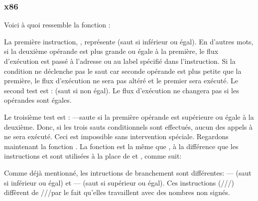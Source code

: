 \subsubsection{x86}


Voici à quoi ressemble la fonction  :




La première instruction, \JLE, représente  (saut si inférieur ou égal).
En d'autres mots, si la deuxième opérande est plus grande ou égale à la première,
le flux d'exécution est passé à l'adresse ou au label spécifié dans l'instruction.
Si la condition ne déclenche pas le saut car seconde opérande est plus petite que
la première, le flux d'exécution ne sera pas altéré et le premier \printf sera
exécuté.
Le second test est \JNE:  (saut si non égal).
Le flux d'exécution ne changera pas si les opérandes sont égales.

Le troisième test est \JGE: ---saute si la première
opérande est supérieure ou égale à la deuxième.
Donc, si les trois sauts conditionnels sont effectués, aucun des appels à \printf
ne sera exécuté.
Ceci est impossible sans intervention spéciale.
Regardons maintenant la fonction .
La fonction  est la même que , à la différence
que les instructions \JBE et \JAE sont utilisées à la place de \JLE et \JGE, comme
suit:




Comme déjà mentionné, les intructions de branchement sont différentes:
\JBE--- (saut si inférieur ou égal) et \JAE---
(saut si supérieur ou égal).
Ces instructions (\JA/\JAE/\JB/\JBE) diffèrent de \JG/\JGE/\JL/\JLE par le fait qu'elles
travaillent avec des nombres non signés.


